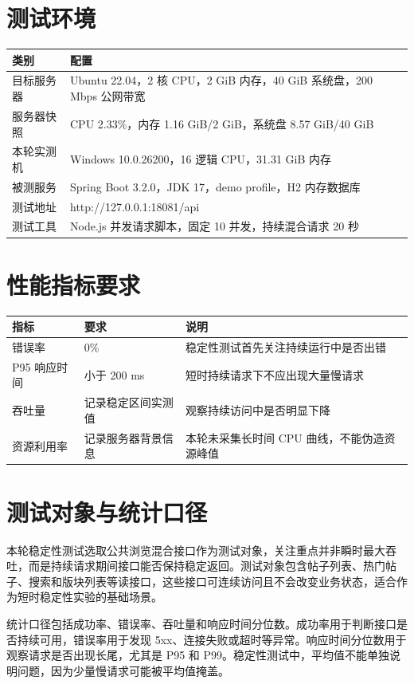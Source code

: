 \documentclass[UTF8,a4paper,12pt]{ctexart}
\begin{document}
\section{测试环境}
\begin{longtable}{P{3.2cm}P{10.8cm}}
\toprule
类别 & 配置\\
\midrule
目标服务器 & Ubuntu 22.04，2 核 CPU，2 GiB 内存，40 GiB 系统盘，200 Mbps 公网带宽\\
服务器快照 & CPU 2.33\%，内存 1.16 GiB/2 GiB，系统盘 8.57 GiB/40 GiB\\
本轮实测机 & Windows 10.0.26200，16 逻辑 CPU，31.31 GiB 内存\\
被测服务 & Spring Boot 3.2.0，JDK 17，demo profile，H2 内存数据库\\
测试地址 & http://127.0.0.1:18081/api\\
测试工具 & Node.js 并发请求脚本，固定 10 并发，持续混合请求 20 秒\\
\bottomrule
\end{longtable}

\section{性能指标要求}
\begin{longtable}{P{3.2cm}P{4.2cm}P{6.2cm}}
\toprule
指标 & 要求 & 说明\\
\midrule
错误率 & 0\% & 稳定性测试首先关注持续运行中是否出错\\
P95 响应时间 & 小于 200 ms & 短时持续请求下不应出现大量慢请求\\
吞吐量 & 记录稳定区间实测值 & 观察持续访问中是否明显下降\\
资源利用率 & 记录服务器背景信息 & 本轮未采集长时间 CPU 曲线，不能伪造资源峰值\\
\bottomrule
\end{longtable}

\section{测试对象与统计口径}
本轮稳定性测试选取公共浏览混合接口作为测试对象，关注重点并非瞬时最大吞吐，而是持续请求期间接口能否保持稳定返回。测试对象包含帖子列表、热门帖子、搜索和版块列表等读接口，这些接口可连续访问且不会改变业务状态，适合作为短时稳定性实验的基础场景。

统计口径包括成功率、错误率、吞吐量和响应时间分位数。成功率用于判断接口是否持续可用，错误率用于发现 5xx、连接失败或超时等异常。响应时间分位数用于观察请求是否出现长尾，尤其是 P95 和 P99。稳定性测试中，平均值不能单独说明问题，因为少量慢请求可能被平均值掩盖。
\end{document}
